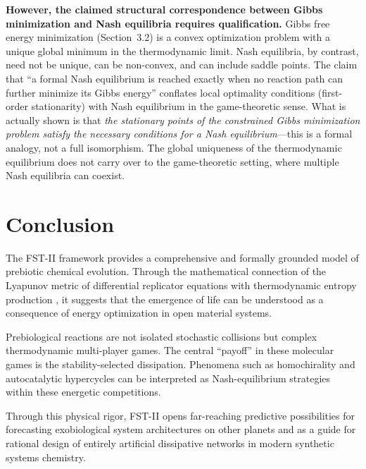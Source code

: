 \documentclass[12pt,a4paper]{article}
\theoremstyle{remark}
\begin{document}
\textbf{However, the claimed structural correspondence between Gibbs minimization and Nash equilibria requires qualification.} Gibbs free energy minimization (Section~3.2) is a convex optimization problem with a unique global minimum in the thermodynamic limit. Nash equilibria, by contrast, need not be unique, can be non-convex, and can include saddle points. The claim that ``a formal Nash equilibrium is reached exactly when no reaction path can further minimize its Gibbs energy'' conflates local optimality conditions (first-order stationarity) with Nash equilibrium in the game-theoretic sense. What is actually shown is that \emph{the stationary points of the constrained Gibbs minimization problem satisfy the necessary conditions for a Nash equilibrium}---this is a formal analogy, not a full isomorphism. The global uniqueness of the thermodynamic equilibrium does not carry over to the game-theoretic setting, where multiple Nash equilibria can coexist.

\section{Conclusion}
\label{sec:conclusion}

The FST-II framework provides a comprehensive and formally grounded model of prebiotic chemical evolution. Through the mathematical connection of the Lyapunov metric of differential replicator equations with thermodynamic entropy production \citep{ReplicatorEntropy}, it suggests that the emergence of life can be understood as a consequence of energy optimization in open material systems.

Prebiological reactions are not isolated stochastic collisions but complex thermodynamic multi-player games. The central ``payoff'' in these molecular games is the stability-selected dissipation. Phenomena such as homochirality and autocatalytic hypercycles can be interpreted as Nash-equilibrium strategies within these energetic competitions.

Through this physical rigor, FST-II opens far-reaching predictive possibilities for forecasting exobiological system architectures on other planets and as a guide for rational design of entirely artificial dissipative networks in modern synthetic systems chemistry.

\end{document}
